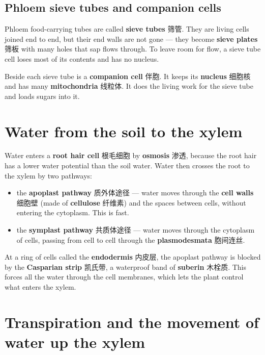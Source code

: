 \documentclass[11pt]{article}
\begin{document}
\subsection*{Phloem sieve tubes and companion cells}

Phloem food-carrying tubes are called \textbf{sieve tubes} 筛管. They are living cells joined end to end, but their end walls are not gone — they become \textbf{sieve plates} 筛板 with many holes that sap flows through. To leave room for flow, a sieve tube cell loses most of its contents and has no nucleus.

Beside each sieve tube is a \textbf{companion cell} 伴胞. It keeps its \textbf{nucleus} 细胞核 and has many \textbf{mitochondria} 线粒体. It does the living work for the sieve tube and loads sugars into it.

\section*{Water from the soil to the xylem}

Water enters a \textbf{root hair cell} 根毛细胞 by \textbf{osmosis} 渗透, because the root hair has a lower water potential than the soil water. Water then crosses the root to the xylem by two pathways:

\begin{itemize}
\item the \textbf{apoplast pathway} 质外体途径 — water moves through the \textbf{cell walls} 细胞壁 (made of \textbf{cellulose} 纤维素) and the spaces between cells, without entering the cytoplasm. This is fast.

\item the \textbf{symplast pathway} 共质体途径 — water moves through the cytoplasm of cells, passing from cell to cell through the \textbf{plasmodesmata} 胞间连丝.

\end{itemize}

At a ring of cells called the \textbf{endodermis} 内皮层, the apoplast pathway is blocked by the \textbf{Casparian strip} 凯氏带, a waterproof band of \textbf{suberin} 木栓质. This forces all the water through the cell membranes, which lets the plant control what enters the xylem.

\section*{Transpiration and the movement of water up the xylem}
\end{document}
